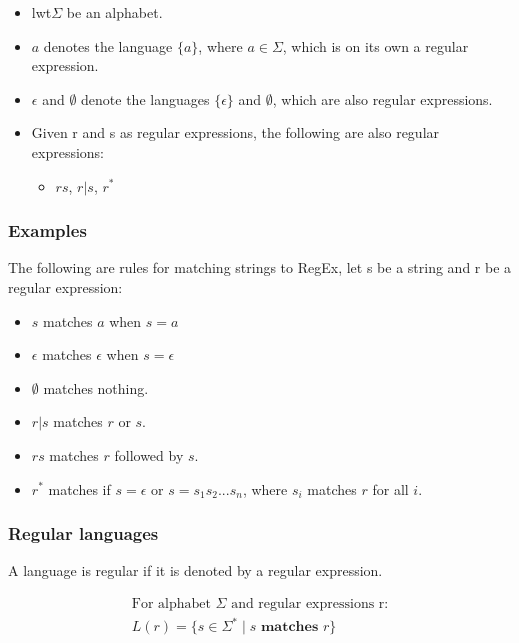 \documentclass{article}
\begin{document}
\begin{itemize}
    \item lwt$\Sigma$ be an alphabet.
    \item $a$ denotes the language $\{a\}$, where $a \in \Sigma$, which is on its own a regular expression.
    \item $\epsilon$ and $\emptyset$ denote the languages $\{\epsilon\}$ and $\emptyset$, which are also regular expressions.
    \item Given r and s as regular expressions, the following are also regular expressions:
          \begin{itemize}
              \item $rs$, $r|s$, $r^*$
          \end{itemize}
\end{itemize}

\subsubsection{Examples}

The following are rules for matching strings to RegEx, let s be a string and r be a regular expression:

\begin{itemize}
    \item $s$ matches $a$ when $s = a$
    \item $\epsilon$ matches $\epsilon$ when $s = \epsilon$
    \item $\emptyset$ matches nothing.
    \item $r|s$ matches $r$ or $s$.
    \item $rs$ matches $r$ followed by $s$.
    \item $r^*$ matches if $s = \epsilon$ or $s = s_1s_2...s_n$, where $s_i$ matches $r$ for all $i$.
\end{itemize}

\subsubsection{Regular languages}

A language is regular if it is denoted by a regular expression.

\begin{align*}
    \text{For alphabet $\Sigma$ and regular expressions r:} \\
    L(r) = \{s \in \Sigma^* \mid s \textbf{ matches } r\}
\end{align*}
\end{document}
